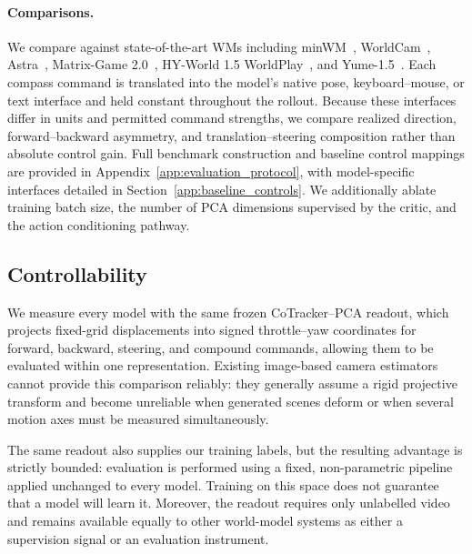 \documentclass[letterpaper]{article} %
\begin{document}
\paragraph{Comparisons.}
We compare against state-of-the-art WMs including minWM~\cite{minwm}, WorldCam~\cite{worldcam},
Astra~\cite{astra}, Matrix-Game 2.0~\cite{matrixgame2},
HY-World 1.5 WorldPlay~\cite{hyworldplay}, and
Yume-1.5~\cite{yume}. Each compass command is translated into the model's native pose, keyboard–mouse, or text interface and held constant throughout the rollout. Because these interfaces differ in units and permitted command
strengths, we compare realized direction, forward--backward asymmetry, and
translation--steering composition rather than absolute control gain.
Full benchmark construction and baseline control mappings are provided in
Appendix~\ref{app:evaluation_protocol}, with model-specific interfaces detailed
in Section~\ref{app:baseline_controls}. We additionally ablate training batch
size, the number of PCA dimensions supervised by the critic, and the action
conditioning pathway.

\subsection{Controllability}

We measure every model with the same frozen CoTracker--PCA readout, which
projects fixed-grid displacements into signed throttle--yaw coordinates for
forward, backward, steering, and compound commands, allowing them to be evaluated within one representation. Existing image-based camera estimators cannot provide
this comparison reliably: they generally assume a rigid projective transform
and become unreliable when generated scenes deform or when several motion axes
must be measured simultaneously.

The same readout also supplies our training labels, but the resulting advantage
is strictly bounded: evaluation is performed using a fixed,
non-parametric pipeline applied unchanged to every model. Training on this space
does not guarantee that a model will learn it.
Moreover, the readout requires only unlabelled video and remains available equally
to other world-model systems as either a supervision signal or an evaluation
instrument.
\end{document}
